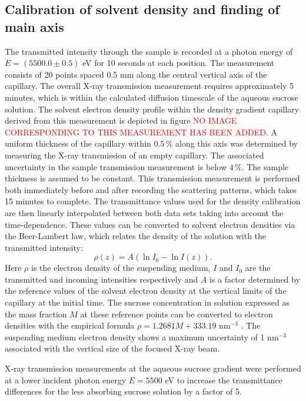 \subsection{Calibration of solvent density and finding of main axis}
The transmitted intensity through the sample is recorded at a photon energy of \(E = (5500.0 \pm  0.5)\) eV for 10 seconds at each position. The measurement consists of 20 points spaced 0.5 mm along the central vertical axis of the capillary. The overall X-ray transmission measurement requires approximately 5 minutes, which is within the calculated diffusion timescale of the aqueous sucrose solution. The solvent electron density profile within the density gradient capillary derived from this measurement is depicted in figure \textcolor{red}{NO IMAGE CORRESPONDING TO THIS MEASUREMENT HAS BEEN ADDED}. A uniform thickness of the capillary within $0.5\,\%$ along this axis was determined by measuring the X-ray transmission of an empty capillary. The associated uncertainty in the sample transmission measurement is below $4\,\%$. The sample thickness is assumed to be constant. This transmission measurement is performed both immediately before and after recording the scattering patterns, which takes 15 minutes to complete. The transmittance values used for the density calibration are then linearly interpolated between both data sets taking into account the time-dependence. These values can be converted to solvent electron densities via the Beer-Lambert law, which relates the density of the solution with the transmitted intensity:
\begin{equation}
  \rho(z) = A \left( \ln{I_0} - \ln{I(z)} \right) .
\end{equation}
Here \(\rho\) is the electron density of the suspending medium, $I$ and $I_0$ are the transmitted and incoming intensities respectively and $A$ is a factor determined by the reference values of the solvent electron density at the vertical limits of the capillary at the initial time. The sucrose concentration in solution expressed as the mass fraction \( M \) at these reference points can be converted to electron densities with the empirical formula \( \rho=1.2681M+333.19 \) nm\(^{-3}\) \citep{haynes_crc_2012}. The suspending medium electron density shows a maximum uncertainty of 1 nm$^{-3}$ associated with the vertical size of the focused X-ray beam.

X-ray transmission measurements at the aqueous sucrose gradient were performed at a lower incident photon energy $E = 5500$ eV to increase the transmittance differences for the less absorbing sucrose solution by a factor of 5.

